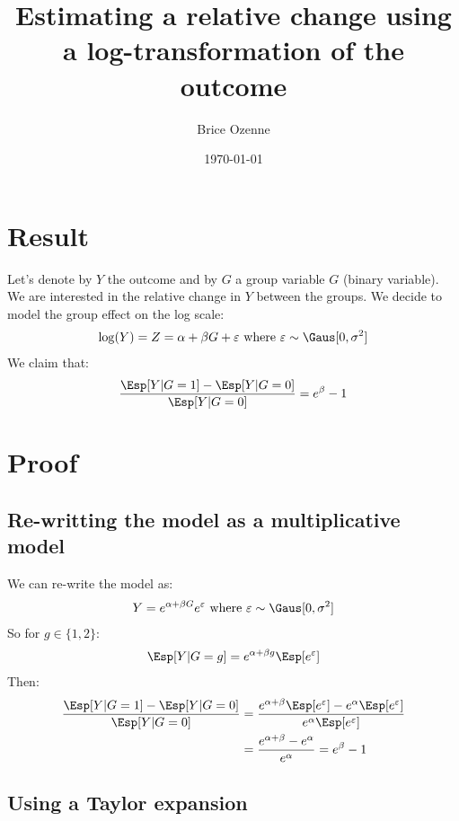 \documentclass[12pt]{article}
\author{Brice Ozenne}
\date{\today}
\title{Estimating a relative change using a log-transformation of the outcome}
\begin{document}
\maketitle

\section{Result}
\label{sec:org6b8bc61}
Let's denote by \(Y\) the outcome and by \(G\) a group variable
\(G\) (binary variable). We are interested in the relative change in \(Y\) between the
groups. We decide to model the group effect on the log scale:
\begin{align*}
\log(Y) = Z = \alpha + \beta G + \varepsilon \text{ where } \varepsilon \sim \Gaus[0,\sigma^2]
\end{align*}
We claim that:
\begin{align*}
\frac{\Esp[Y|G=1]-\Esp[Y|G=0]}{\Esp[Y|G=0]} = e^{\beta} - 1
\end{align*}

\section{Proof}
\label{sec:org8caff4f}

\subsection{Re-writting the model as a multiplicative model}
\label{sec:orgb244dee}
We can re-write the model as:
\begin{align*}
Y = e^{\alpha + \beta G}e^{\varepsilon} \text{ where } \varepsilon \sim \Gaus[0,\sigma^2]
\end{align*}
So for \(g\in\{1,2\}\):
\begin{align*}
\Esp[Y|G=g] = e^{\alpha + \beta g} \Esp[e^{\varepsilon}]
\end{align*}
Then:
\begin{align*}
\frac{\Esp[Y|G=1]-\Esp[Y|G=0]}{\Esp[Y|G=0]}
& = \frac{e^{\alpha + \beta} \Esp[e^{\varepsilon}]-e^{\alpha} \Esp[e^{\varepsilon}]}{e^{\alpha} \Esp[e^{\varepsilon}]} \\
& = \frac{e^{\alpha + \beta} -e^{\alpha}}{e^{\alpha}}  = e^{\beta} - 1 \\
\end{align*}

\subsection{Using a Taylor expansion}
\label{sec:org59193d1}
\end{document}
